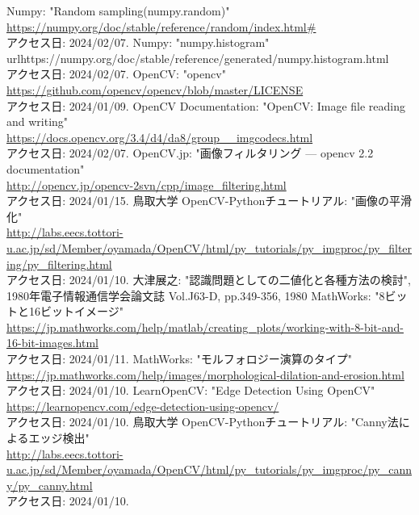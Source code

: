 \documentclass[uplatex, report, a4j, 10pt]{jsbook}
\begin{document}
\begin{thebibliography}{0}
  Numpy: "Random sampling(numpy.random)"\\\url{https://numpy.org/doc/stable/reference/random/index.html#}\\アクセス日: 2024/02/07.
  Numpy: "numpy.histogram"\\url{https://numpy.org/doc/stable/reference/generated/numpy.histogram.html}\\アクセス日: 2024/02/07.
  OpenCV: "opencv"\\\url{https://github.com/opencv/opencv/blob/master/LICENSE}\\アクセス日: 2024/01/09.
  OpenCV Documentation: "OpenCV: Image file reading and writing" \\\url{https://docs.opencv.org/3.4/d4/da8/group__imgcodecs.html}\\アクセス日: 2024/02/07.
  OpenCV.jp: "画像フィルタリング — opencv 2.2 documentation"\\\url{http://opencv.jp/opencv-2svn/cpp/image_filtering.html}\\アクセス日: 2024/01/15.
  鳥取大学 OpenCV-Pythonチュートリアル: "画像の平滑化"\\\url{http://labs.eecs.tottori-u.ac.jp/sd/Member/oyamada/OpenCV/html/py_tutorials/py_imgproc/py_filtering/py_filtering.html}\\アクセス日: 2024/01/10.
  大津展之: "認識問題としての二値化と各種方法の検討", 1980年電子情報通信学会論文誌 Vol.J63-D, pp.349-356, 1980
  MathWorks: "8ビットと16ビットイメージ"\\\url{https://jp.mathworks.com/help/matlab/creating_plots/working-with-8-bit-and-16-bit-images.html}\\アクセス日: 2024/01/11.
  MathWorks: "モルフォロジー演算のタイプ"\\\url{https://jp.mathworks.com/help/images/morphological-dilation-and-erosion.html}\\アクセス日: 2024/01/10.
  LearnOpenCV: "Edge Detection Using OpenCV"\\\url{https://learnopencv.com/edge-detection-using-opencv/}\\アクセス日: 2024/01/10.
  鳥取大学 OpenCV-Pythonチュートリアル: "Canny法によるエッジ検出"\\\url{http://labs.eecs.tottori-u.ac.jp/sd/Member/oyamada/OpenCV/html/py_tutorials/py_imgproc/py_canny/py_canny.html}\\アクセス日: 2024/01/10.

\end{thebibliography}
\end{document}
